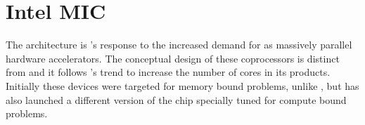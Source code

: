 \documentclass[../thesis]{subfiles}
\begin{document}
	\chapter{Intel MIC}
	\label{chp:mic}

	The \mic architecture \cite{Intel:XeonPhi:DevGuide} is \intel's response to the increased demand for \gpgpus as massively parallel hardware accelerators. The conceptual design of these coprocessors is distinct from \gpgpus and it follows \intel's trend to increase the number of cores in its products. Initially these devices were targeted for memory bound problems, unlike \gpus, but \intel has also launched a different version of the chip specially tuned for compute bound problems.

	
	
	
	
	
	
\end{document}

